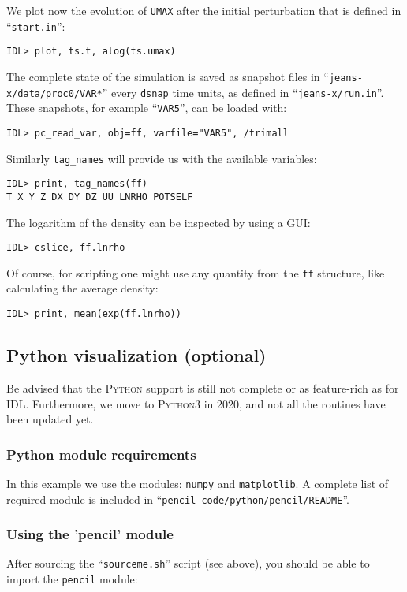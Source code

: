 \documentclass[a4paper,12pt]{article}
\newcommand{\file}[1]{``\texttt{#1}''}
\newcommand{\name}[1]{\textsc{#1}}
\newcommand{\code}[1]{\texttt{#1}}
\begin{document}
We plot now the evolution of \code{UMAX} after the initial perturbation that is defined in \file{start.in}:
\begin{verbatim}
IDL> plot, ts.t, alog(ts.umax)
\end{verbatim}

The complete state of the simulation is saved as snapshot files in
\file{jeans-x/data/proc0/VAR*} every \code{dsnap} time units,
as defined in \file{jeans-x/run.in}.
These snapshots, for example \file{VAR5}, can be loaded with:
\begin{verbatim}
IDL> pc_read_var, obj=ff, varfile="VAR5", /trimall
\end{verbatim}

Similarly \code{tag\_names} will provide us with the available variables:
\begin{verbatim}
IDL> print, tag_names(ff)
T X Y Z DX DY DZ UU LNRHO POTSELF
\end{verbatim}

The logarithm of the density can be inspected by using a GUI:
\begin{verbatim}
IDL> cslice, ff.lnrho
\end{verbatim}

Of course, for scripting one might use any quantity from the \code{ff} structure, like calculating the average density:
\begin{verbatim}
IDL> print, mean(exp(ff.lnrho))
\end{verbatim}


\subsection{Python visualization (optional)}
Be advised that the \name{Python} support is still not complete or as feature-rich as for \name{IDL}.
Furthermore, we move to \name{Python3} in 2020, and not all the routines have 
been updated yet.

\subsubsection{Python module requirements}
 

In this example we use the modules: \code{numpy} and \code{matplotlib}.
A complete list of required module is included in 
\file{pencil-code/python/pencil/README}.


\subsubsection{Using the 'pencil' module}
After sourcing the \file{sourceme.sh} script (see above), you should be able to import the \code{pencil} module:
\end{document}
